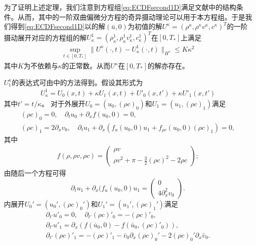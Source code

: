 为了证明上述定理，我们注意到方程组\eqref{eq:ECDFsecond1D}满足文献\cite{yong1992singular,yong1999singular}中的结构条件。从而，其中的一阶双曲偏微分方程的奇异摄动理论可以用于本方程组。于是我们得到\eqref{eq:ECDFsecond1D}以的解$(\bar{u},0)$为初值的解$U^\kappa = (\rho^\kappa, \rho^\kappa v^\kappa, c^\kappa)^T$的一阶摄动展开对应的方程组的解$U_\kappa^1=(\rho_\kappa^1,\rho_\kappa^1 v_\kappa^1, c^1_\kappa)^T$在$[0,T_*]$上满足
\begin{eqnarray}\label{53}
  \sup_{t \in [0, T_*]} \|U^\kappa(\cdot, t) - U_\kappa^1(\cdot, t)\|_{H^s} \le K\kappa^2
\end{eqnarray}
其中$K$为不依赖与$\kappa$的正常数。从而$U^\kappa$在$[0,T_*]$的解亦存在。

$U^\kappa_1$的表达式可由\cite{yong1992singular,yong1999singular}中的方法得到。假设其形式为
\begin{eqnarray*}
U^1_\kappa  = U_0(x,t) + \kappa U_1(x,t) + U'_0(x,t') + \kappa U'_1(x,t')
\end{eqnarray*}
其中$t'=t/\kappa$。
对于外展开$U_0=(u_0, (\rho c)_0)$和$U_1=(u_1, (\rho c)_1)$满足
\begin{eqnarray}
 (\rho c)_0 = 0, \quad
  \partial_t u_0+ \partial_x f(u_0,0)=0 , \nonumber \\
  (\rho c)_1 = 2\partial_x v_0, \quad
  \partial_t u_1 + \partial_x (f_u(u_0,0) u_1 + f_{\rho c}(u_0,0)(\rho c)_1)  = 0 \label{54},
	\end{eqnarray}
其中
\begin{eqnarray*}
  f(\rho,\rho v,\rho c) = \left( \begin{array}{cc} \rho v \\ \rho v^2 + \pi - \frac{3}{2} (\rho c)^2 - 2\rho c \end{array} \right);
\end{eqnarray*}
由随后一个方程可得
\begin{equation*}
	  \partial_t u_1 + \partial_x (f_u(u_0,0) u_1   = \left( \begin{matrix}
	  		0 \\ 4 \partial_x^2 v_0
	  \end{matrix} \right).
\end{equation*}
内展开$U_0'=(u_0', (\rho c)_0')$和$U_1'=(u_1', (\rho c)_1')$满足
\begin{eqnarray*}
 \partial_{t'} u'_0 = 0,  \quad \partial_{t'} (\rho c)'_0 = -(\rho c)'_0 , \\
  \partial_{t'} u'_1 = \partial_x(f(\bar u_0,0) - f(\bar u_0,(\rho c)'_0)), \\
  \partial_{t'} (\rho c)'_1 = - (\rho c)'_1 - \bar v_0 \partial_x (\rho c)_0' -2 (\rho c)_0'\partial_x \bar v_0.
\end{eqnarray*}

